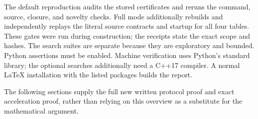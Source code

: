The default reproduction audits the stored certificates and reruns the
command, source, closure, and novelty checks. Full mode additionally
rebuilds and independently replays the literal source contracts and
startup for all four tables. These gates were run during construction;
the receipts state the exact scope and hashes. The search suites are
separate because they are exploratory and bounded. Python assertions
must be enabled. Machine verification uses Python's standard library;
the optional searches additionally need a C++17 compiler. A normal
LaTeX installation with the listed packages builds the report.

The following sections supply the full new written protocol proof and
exact acceleration proof, rather than relying on this overview as a
substitute for the mathematical argument.
